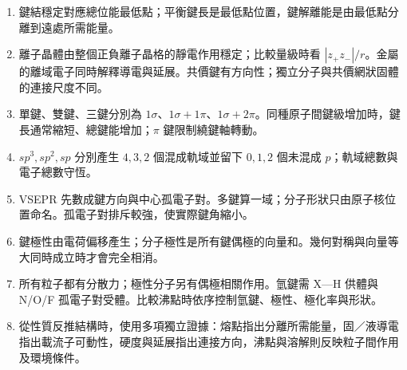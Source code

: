 \documentclass[11pt,a4paper]{article}
\providecommand{\tightlist}{%
  \setlength{\itemsep}{0pt}\setlength{\parskip}{0pt}}
\begin{document}
\begin{enumerate}
\def\labelenumi{\arabic{enumi}.}
\tightlist
\item
  鍵結穩定對應總位能最低點；平衡鍵長是最低點位置，鍵解離能是由最低點分離到遠處所需能量。
\item
  離子晶體由整個正負離子晶格的靜電作用穩定；比較量級時看 \(|z_+z_-|/r\)。金屬的離域電子同時解釋導電與延展。共價鍵有方向性；獨立分子與共價網狀固體的連接尺度不同。
\item
  單鍵、雙鍵、三鍵分別為 \(1\sigma\)、\(1\sigma+1\pi\)、\(1\sigma+2\pi\)。同種原子間鍵級增加時，鍵長通常縮短、總鍵能增加；\(\pi\) 鍵限制繞鍵軸轉動。
\item
  \(sp^3,sp^2,sp\) 分別產生 \(4,3,2\) 個混成軌域並留下 \(0,1,2\) 個未混成 \(p\)；軌域總數與電子總數守恆。
\item
  VSEPR 先數成鍵方向與中心孤電子對。多鍵算一域；分子形狀只由原子核位置命名。孤電子對排斥較強，使實際鍵角縮小。
\item
  鍵極性由電荷偏移產生；分子極性是所有鍵偶極的向量和。幾何對稱與向量等大同時成立時才會完全相消。
\item
  所有粒子都有分散力；極性分子另有偶極相關作用。氫鍵需 X---H 供體與 N/O/F 孤電子對受體。比較沸點時依序控制氫鍵、極性、極化率與形狀。
\item
  從性質反推結構時，使用多項獨立證據：熔點指出分離所需能量，固／液導電指出載流子可動性，硬度與延展指出連接方向，沸點與溶解則反映粒子間作用及環境條件。
\end{enumerate}
\end{document}
